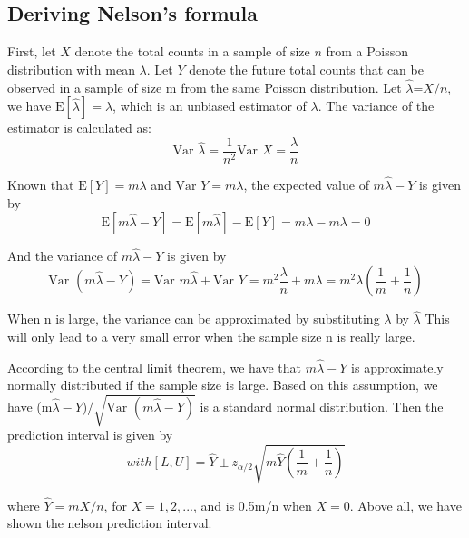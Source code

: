 \documentclass[a4paper]{article}
\begin{document}
{{\subsection{Deriving Nelson's formula}
\par{First, let $X$ denote the total counts in a sample of size $n$ from a Poisson distribution with mean $\lambda$. Let $Y$ denote the future total counts that can be observed in a sample of size m from the same Poisson distribution. Let $\hat{\lambda}$=$X/n$, we have $\textrm{E}[\hat{\lambda}]=\lambda$, which is an unbiased estimator of $\lambda$. The variance of the estimator is calculated as:}
\begin{equation}
    \textrm{Var }\hat{\lambda}=\frac{1}{n^2}\textrm{Var }X=\frac{\lambda}{n}
\end{equation}
\par{Known that $\textrm{E}[Y]=m\lambda$ and $\textrm{Var }Y=m\lambda$, the expected value of $m\hat{\lambda} -Y$ is given by}
\begin{equation}
    \textrm{E}[m\hat{\lambda}-Y]=\textrm{E}[m\hat{\lambda}]-\textrm{E}[Y]=m\lambda-m\lambda=0
\end{equation}
\par{And the variance of $m\hat{\lambda} -Y$ is given by}
\begin{equation}
    \textrm{Var }(m\hat{\lambda}-Y)=\textrm{Var }m\hat{\lambda}+\textrm{Var }Y=m^2\frac{\lambda}{n}+m\lambda=m^2\lambda(\frac{1}{m}+\frac{1}{n})
\end{equation}
\par{When n is large, the variance can be approximated by substituting $\lambda$ by $\hat{\lambda}$ This will only lead to a very small error when the sample size n is really large.}
\par{According to the central limit theorem, we have that $m\hat{\lambda}-Y$ is approximately normally distributed if the sample size is large. Based on this assumption, we have (m$\hat{\lambda}-Y$)/$\sqrt{\textrm{Var }(m\hat{\lambda}-Y)}$ is a standard normal distribution. Then the prediction interval is given by}
\begin{equation}
[\lceil L \rceil,\lfloor U \rfloor]       with [L,U]=\hat{Y}\pm z_{\alpha/2}\sqrt{m\hat{Y}(\frac{1}{m}+\frac{1}{n})}
\end{equation}
\par{where $\hat{Y}=m X/n$, for $X=1,2,...$, and is 0.5m/n when $X=0$. Above all, we have shown the nelson prediction interval.}%
}}
\end{document}
